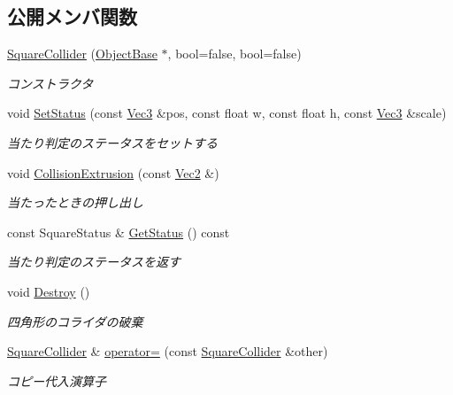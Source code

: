 \subsection*{公開メンバ関数}
\begin{DoxyCompactItemize}
\item 
\mbox{\hyperlink{class_square_collider_a354753b61e7fa39cb5e7aadcddb78910}{Square\+Collider}} (\mbox{\hyperlink{class_object_base}{Object\+Base}} $\ast$, bool=false, bool=false)
\begin{DoxyCompactList}\small\item\em コンストラクタ \end{DoxyCompactList}\item 
void \mbox{\hyperlink{class_square_collider_a382870e5f0bc29b4f38eb476ecb2fd68}{Set\+Status}} (const \mbox{\hyperlink{common_8h_ab1cb35b3a17c398d8ef71d5f779808bf}{Vec3}} \&pos, const float w, const float h, const \mbox{\hyperlink{common_8h_ab1cb35b3a17c398d8ef71d5f779808bf}{Vec3}} \&scale)
\begin{DoxyCompactList}\small\item\em 当たり判定のステータスをセットする \end{DoxyCompactList}\item 
void \mbox{\hyperlink{class_square_collider_ac250db865d0755fc8731f1660397943d}{Collision\+Extrusion}} (const \mbox{\hyperlink{common_8h_ae148fff5818e9444b4ab2288829559bf}{Vec2}} \&)
\begin{DoxyCompactList}\small\item\em 当たったときの押し出し \end{DoxyCompactList}\item 
const Square\+Status \& \mbox{\hyperlink{class_square_collider_ac437bc1bed951c82ca25d2b17a7b2e0f}{Get\+Status}} () const
\begin{DoxyCompactList}\small\item\em 当たり判定のステータスを返す \end{DoxyCompactList}\item 
void \mbox{\hyperlink{class_square_collider_a83273e0e63692aa8020b8deedd456886}{Destroy}} ()
\begin{DoxyCompactList}\small\item\em 四角形のコライダの破棄 \end{DoxyCompactList}\item 
\mbox{\hyperlink{class_square_collider}{Square\+Collider}} \& \mbox{\hyperlink{class_square_collider_aaa648559b58219a455333f3a100c1d67}{operator=}} (const \mbox{\hyperlink{class_square_collider}{Square\+Collider}} \&other)
\begin{DoxyCompactList}\small\item\em コピー代入演算子 \end{DoxyCompactList}\end{DoxyCompactItemize}
